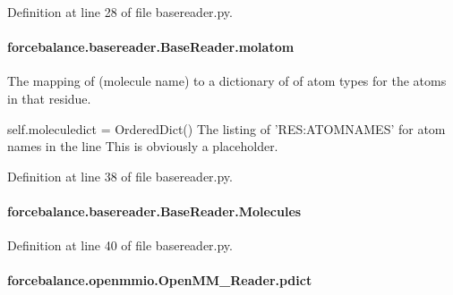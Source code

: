 Definition at line 28 of file basereader.\-py.

\hypertarget{classforcebalance_1_1basereader_1_1BaseReader_a56e6e6024825ada94ab24f5f3ce59851}{
\paragraph[{molatom}]{\setlength{\rightskip}{0pt plus 5cm}forcebalance.\-basereader.\-Base\-Reader.\-molatom\hspace{0.3cm}{\ttfamily [inherited]}}}\label{classforcebalance_1_1basereader_1_1BaseReader_a56e6e6024825ada94ab24f5f3ce59851}


The mapping of (molecule name) to a dictionary of of atom types for the atoms in that residue. 

self.\-moleculedict = Ordered\-Dict() The listing of 'R\-E\-S\-:A\-T\-O\-M\-N\-A\-M\-E\-S' for atom names in the line This is obviously a placeholder. 

Definition at line 38 of file basereader.\-py.

\hypertarget{classforcebalance_1_1basereader_1_1BaseReader_ad2842550aa690f1cd82e41ec8d6fe541}{
\paragraph[{Molecules}]{\setlength{\rightskip}{0pt plus 5cm}forcebalance.\-basereader.\-Base\-Reader.\-Molecules\hspace{0.3cm}{\ttfamily [inherited]}}}\label{classforcebalance_1_1basereader_1_1BaseReader_ad2842550aa690f1cd82e41ec8d6fe541}


Definition at line 40 of file basereader.\-py.

\hypertarget{classforcebalance_1_1openmmio_1_1OpenMM__Reader_a4fa2da992c7f0f525dcc465ffba69b86}{
\paragraph[{pdict}]{\setlength{\rightskip}{0pt plus 5cm}forcebalance.\-openmmio.\-Open\-M\-M\-\_\-\-Reader.\-pdict}}\label{classforcebalance_1_1openmmio_1_1OpenMM__Reader_a4fa2da992c7f0f525dcc465ffba69b86}


